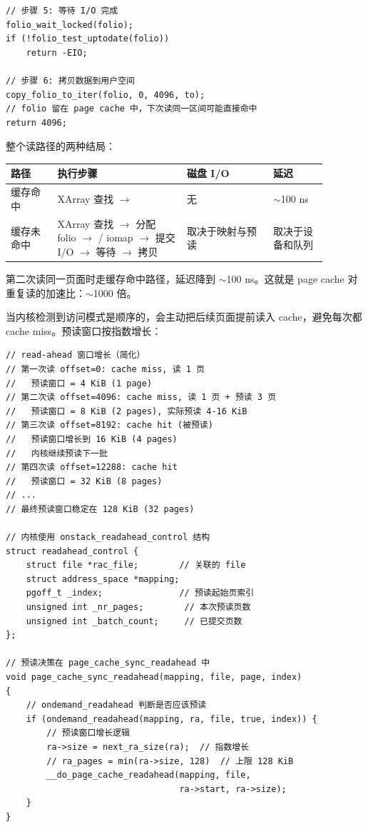 \begin{filesystemlayout}
\begin{lstlisting}
// 步骤 5: 等待 I/O 完成
folio_wait_locked(folio);
if (!folio_test_uptodate(folio))
    return -EIO;

// 步骤 6: 拷贝数据到用户空间
copy_folio_to_iter(folio, 0, 4096, to);
// folio 留在 page cache 中，下次读同一区间可能直接命中
return 4096;
\end{lstlisting}

整个读路径的两种结局：

\begin{longtable}{|F{0.13\linewidth}|F{0.36\linewidth}|F{0.24\linewidth}|F{0.15\linewidth}|}
\toprule
{}
路径 & 执行步骤 & 磁盘 I/O & 延迟 \\
\midrule
缓存命中 & XArray 查找 $\to$  & 无 & $\sim$100 ns \\\tablerowrule
缓存未命中 & XArray 查找 $\to$ 分配 folio $\to$  / iomap $\to$ 提交 I/O $\to$ 等待 $\to$ 拷贝 & 取决于映射与预读 & 取决于设备和队列 \\
\bottomrule
\end{longtable}

第二次读同一页面时走缓存命中路径，延迟降到 $\sim$100 ns。这就是 page cache 对重复读的加速比：$\sim$1000 倍。


当内核检测到访问模式是顺序的，会主动把后续页面提前读入 cache，避免每次都 cache miss。预读窗口按指数增长：

\begin{lstlisting}
// read-ahead 窗口增长（简化）
// 第一次读 offset=0: cache miss, 读 1 页
//   预读窗口 = 4 KiB (1 page)
// 第二次读 offset=4096: cache miss, 读 1 页 + 预读 3 页
//   预读窗口 = 8 KiB (2 pages), 实际预读 4-16 KiB
// 第三次读 offset=8192: cache hit (被预读)
//   预读窗口增长到 16 KiB (4 pages)
//   内核继续预读下一批
// 第四次读 offset=12288: cache hit
//   预读窗口 = 32 KiB (8 pages)
// ...
// 最终预读窗口稳定在 128 KiB (32 pages)

// 内核使用 onstack_readahead_control 结构
struct readahead_control {
    struct file *rac_file;        // 关联的 file
    struct address_space *mapping;
    pgoff_t _index;               // 预读起始页索引
    unsigned int _nr_pages;        // 本次预读页数
    unsigned int _batch_count;     // 已提交页数
};

// 预读决策在 page_cache_sync_readahead 中
void page_cache_sync_readahead(mapping, file, page, index)
{
    // ondemand_readahead 判断是否应该预读
    if (ondemand_readahead(mapping, ra, file, true, index)) {
        // 预读窗口增长逻辑
        ra->size = next_ra_size(ra);  // 指数增长
        // ra_pages = min(ra->size, 128)  // 上限 128 KiB
        __do_page_cache_readahead(mapping, file,
                                  ra->start, ra->size);
    }
}
\end{lstlisting}


\end{filesystemlayout}
